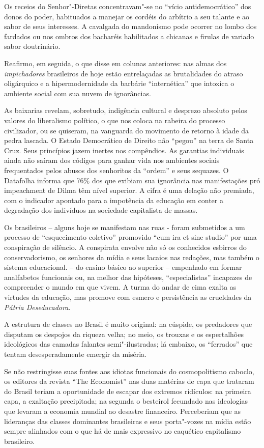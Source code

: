 Os receios do Senhor"-Diretas concentravam"-se no ``vício
antidemocrático'' dos donos do poder, habituados a manejar os cordéis do
arbítrio a seu talante e ao sabor de seus interesses. A cavalgada do
mandonismo pode ocorrer no lombo dos fardados ou nos ombros dos
bacharéis habilitados a chicanas e firulas de variado sabor doutrinário.

Reafirmo, em seguida, o que disse em colunas anteriores: nas almas dos
\emph{impichadores} brasileiros de hoje estão entrelaçadas as
brutalidades do atraso oligárquico e a hipermodernidade da barbárie
``internética'' que intoxica o ambiente social com sua nuvem de
ignorâncias.

As baixarias revelam, sobretudo, indigência cultural e desprezo absoluto
pelos valores do liberalismo político, o que nos coloca na rabeira do
processo civilizador, ou se quiseram, na vanguarda do movimento de
retorno à idade da pedra lascada. O Estado Democrático de Direito não
``pegou'' na terra de Santa Cruz. Seus princípios jazem inertes nos
compêndios. As garantias individuais ainda não saíram dos códigos para
ganhar vida nos ambientes sociais frequentados pelos abusos dos
senhoritos da ``ordem'' e seus sequazes. O Datafolha informa que 76\%
dos que exibiam sua ignorância nas manifestações pró impeachment de
Dilma têm nível superior. A cifra é uma delação não premiada, com o
indicador apontado para a impotência da educação em conter a degradação
dos indivíduos na sociedade capitalista de massas.

Os brasileiros -- alguns hoje se manifestam nas ruas - foram submetidos
a um processo de ``esquecimento coletivo'' promovido ``cum ira et sine
studio'' por uma conspiração de silêncio. A conspirata envolve não só os
conhecidos esbirros do conservadorismo, os senhores da mídia e seus
lacaios nas redações, mas também o sistema educacional. -- do ensino
básico ao superior -- empenhado em formar analfabetos funcionais ou, na
melhor das hipóteses, ``especialistas'' incapazes de compreender o mundo
em que vivem. A turma do andar de cima exalta as virtudes da educação,
mas promove com esmero e persistência as crueldades da \emph{Pátria
Deseducadora.}

A estrutura de classes no Brasil é muito original: na cúspide, os
predadores que disputam os despojos da riqueza velha; no meio, os
trouxas e os espertalhões ideológicos das camadas falantes
semi"-ilustradas; lá embaixo, os ``ferrados'' que tentam desesperadamente
emergir da miséria.

Se não restringisse suas fontes aos idiotas funcionais do cosmopolitismo
caboclo, os editores da revista ``The Economist'' nas duas matérias de
capa que trataram do Brasil teriam a oportunidade de escapar dos
extremos ridículos: na primeira capa, a exaltação precipitada; na
segunda o besteirol fecundado nas ideologias que levaram a economia
mundial ao desastre financeiro. Perceberiam que as lideranças das
classes dominantes brasileiras e seus porta"-vozes na mídia estão sempre
alinhados com o que há de mais expressivo no caquético capitalismo
brasileiro.

